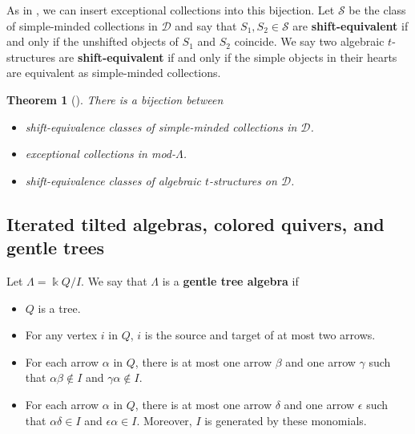 \documentclass[12pt]{amsart}
\newtheorem{thm}{Theorem}[section]
\theoremstyle{definition}
\theoremstyle{remark}
\numberwithin{equation}{section}
\newcommand{\kk}{\ensuremath{\Bbbk}}
\newcommand{\commentout}[1]{}
\newcommand{\cD}{\ensuremath{{\mathcal{D}}}}
\newcommand{\cS}{\ensuremath{{\mathcal{S}}}}
\begin{document}
As in \cite{maresca2024exceptional}, we can insert exceptional collections into this bijection. \commentout{An object $E \in \cD$ is \textbf{exceptional} if Hom$_{\cD}(E,E[i])=0$ for all $i\in\mathbb{Z}-\{0\}$ and Hom$_{\cD}(E,E[i])\cong \kk$. A sequence of exceptional objects $(E_1, E_2, \dots, E_k)$ in $\cD$ is an \textbf{exceptional sequence} if Hom$_{\cD}(E_i,E_j[k]) = 0$ for all $i>j$ and $k\in\mathbb{Z}$. A set of exceptional objects $\{E_1, E_2, \dots, E_k\}$ in $\cD$ is an \textbf{exceptional collection } (\textbf{exceptional set}) if it can be ordered into an exceptional sequence in at least one way. An exceptional sequence (set) is \textbf{complete} if $k$ is the number of simples in mod-$\Lambda$.} Let $\cS$ be the class of simple-minded collections in $\cD$ and say that $S_1, S_2\in \cS$ are  \textbf{shift-equivalent} if and only if the unshifted objects of $S_1$ and $S_2$ coincide. We say two algebraic $t$-structures are \textbf{shift-equivalent} if and only if the simple objects in their hearts are equivalent as simple-minded collections.

\begin{thm}[\cite{maresca2024exceptional}]
    There is a bijection between
    \begin{itemize}
        \item shift-equivalence classes of simple-minded collections in $\cD$.
        \item exceptional collections in mod-$\Lambda$.
        \item shift-equivalence classes of algebraic $t$-structures on $\cD$.
        
    \end{itemize}
    \label{thm: mar24}
\end{thm}

\subsection{Iterated tilted algebras, colored quivers, and gentle trees}

Let $\Lambda = \kk Q/I$. We say that $\Lambda$ is a \textbf{gentle tree algebra} if 
\begin{itemize}
    \item $Q$ is a tree.
    \item For any vertex $i$ in $Q$, $i$ is the source and target of at most two arrows.
    \item For each arrow $\alpha$ in $Q$, there is at most one arrow $\beta$ and one arrow $\gamma$ such that $\alpha\beta \notin I$ and $\gamma\alpha\notin I$.
    \item For each arrow $\alpha$ in $Q$, there is at most one arrow $\delta$ and one arrow $\epsilon$ such that $\alpha\delta \in I$ and $\epsilon\alpha\in I$. Moreover, $I$ is generated by these monomials.
\end{itemize}
\end{document}
